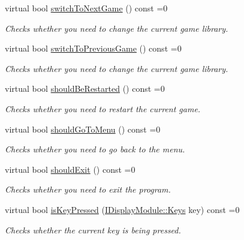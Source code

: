 \begin{DoxyCompactItemize}
virtual bool \mbox{\hyperlink{classArcade_1_1Display_1_1IDisplayModule_a9584cb0ca3b157c9a4ec94509e4f8e32}{switch\+To\+Next\+Game}} () const =0
\begin{DoxyCompactList}\small\item\em Checks whether you need to change the current game library. \end{DoxyCompactList}\item 
virtual bool \mbox{\hyperlink{classArcade_1_1Display_1_1IDisplayModule_a3bbbfe00907c8f3e4c7ef1aadedcc513}{switch\+To\+Previous\+Game}} () const =0
\begin{DoxyCompactList}\small\item\em Checks whether you need to change the current game library. \end{DoxyCompactList}\item 
virtual bool \mbox{\hyperlink{classArcade_1_1Display_1_1IDisplayModule_adc5d499229aa5899bbd4bae14f00cb27}{should\+Be\+Restarted}} () const =0
\begin{DoxyCompactList}\small\item\em Checks whether you need to restart the current game. \end{DoxyCompactList}\item 
virtual bool \mbox{\hyperlink{classArcade_1_1Display_1_1IDisplayModule_ad060f6b99f2adffaf02a4226fc40d0ab}{should\+Go\+To\+Menu}} () const =0
\begin{DoxyCompactList}\small\item\em Checks whether you need to go back to the menu. \end{DoxyCompactList}\item 
virtual bool \mbox{\hyperlink{classArcade_1_1Display_1_1IDisplayModule_a550877fb92d58325404b9ebe9e71f6ff}{should\+Exit}} () const =0
\begin{DoxyCompactList}\small\item\em Checks whether you need to exit the program. \end{DoxyCompactList}\item 
virtual bool \mbox{\hyperlink{classArcade_1_1Display_1_1IDisplayModule_af871661ff84c21581cd7233ba6f27aa0}{is\+Key\+Pressed}} (\mbox{\hyperlink{classArcade_1_1Display_1_1IDisplayModule_a8da3f6b309ca0581473ae8cc8789b619}{I\+Display\+Module\+::\+Keys}} key) const =0
\begin{DoxyCompactList}\small\item\em Checks whether the current key is being pressed. \end{DoxyCompactList}\item 

\end{DoxyCompactItemize}
